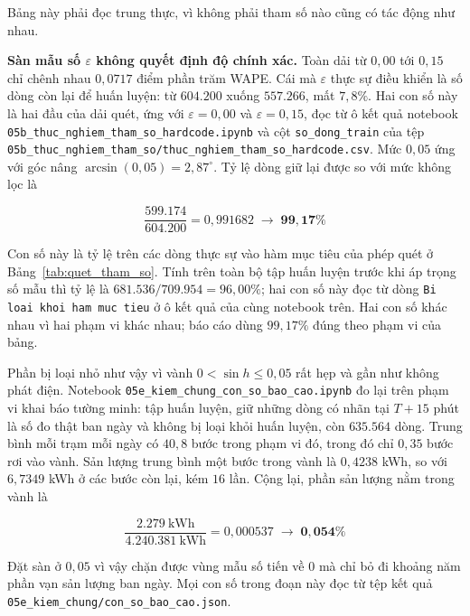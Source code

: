 \documentclass[12pt, a4paper]{report}
\begin{document}
Bảng này phải đọc trung thực, vì không phải tham số nào cũng có tác động như nhau.

\textbf{Sàn mẫu số $\varepsilon$ không quyết định độ chính xác.} Toàn dải từ $0{,}00$ tới
$0{,}15$ chỉ chênh nhau $0{,}0717$ điểm phần trăm WAPE. Cái mà $\varepsilon$ thực sự điều
khiển là số dòng còn lại để huấn luyện: từ $604.200$ xuống $557.266$, mất $7{,}8\%$. Hai
con số này là hai đầu của dải quét, ứng với $\varepsilon = 0{,}00$ và $\varepsilon = 0{,}15$,
đọc từ ô kết quả notebook \texttt{05b\_thuc\_nghiem\_tham\_so\_hardcode.ipynb} và cột
\texttt{so\_dong\_train} của tệp \texttt{05b\_thuc\_nghiem\_tham\_so/thuc\_nghiem\_tham\_so\_hardcode.csv}.
Mức $0{,}05$ ứng với góc nâng $\arcsin(0{,}05) = 2{,}87^\circ$. Tỷ lệ dòng giữ lại được so với mức
không lọc là

\begin{equation}
\frac{599.174}{604.200} = 0{,}991682 \;\longrightarrow\; \mathbf{99{,}17\%}
\end{equation}

Con số này là tỷ lệ trên các dòng thực sự vào hàm mục tiêu của phép quét ở
Bảng~\ref{tab:quet_tham_so}. Tính trên toàn bộ tập huấn luyện trước khi áp trọng số mẫu thì
tỷ lệ là $681.536 / 709.954 = 96{,}00\%$; hai con số này đọc từ dòng
\texttt{Bi loai khoi ham muc tieu} ở ô kết quả của cùng notebook trên. Hai con số khác nhau vì hai phạm vi khác nhau; báo
cáo dùng $99{,}17\%$ đúng theo phạm vi của bảng.

Phần bị loại nhỏ như vậy vì vành $0 < \sin h \le 0{,}05$ rất hẹp và gần như không phát điện.
Notebook \texttt{05e\_kiem\_chung\_con\_so\_bao\_cao.ipynb} đo lại trên phạm vi khai báo tường minh:
tập huấn luyện, giữ những dòng có nhãn tại $T{+}15$ phút là số đo thật ban ngày và không bị
loại khỏi huấn luyện, còn $635.564$ dòng. Trung bình mỗi trạm mỗi ngày có $40{,}8$ bước trong
phạm vi đó, trong đó chỉ $0{,}35$ bước rơi vào vành. Sản lượng trung bình một bước trong vành
là $0{,}4238$ kWh, so với $6{,}7349$ kWh ở các bước còn lại, kém $16$ lần. Cộng lại, phần sản
lượng nằm trong vành là

\begin{equation}
\frac{2.279\ \text{kWh}}{4.240.381\ \text{kWh}} = 0{,}000537 \;\longrightarrow\;
\mathbf{0{,}054\%}
\end{equation}

Đặt sàn ở $0{,}05$ vì vậy chặn được vùng mẫu số tiến về $0$ mà chỉ bỏ đi khoảng năm phần vạn
sản lượng ban ngày. Mọi con số trong đoạn này đọc từ tệp kết quả
\texttt{05e\_kiem\_chung/con\_so\_bao\_cao.json}.
\end{document}
